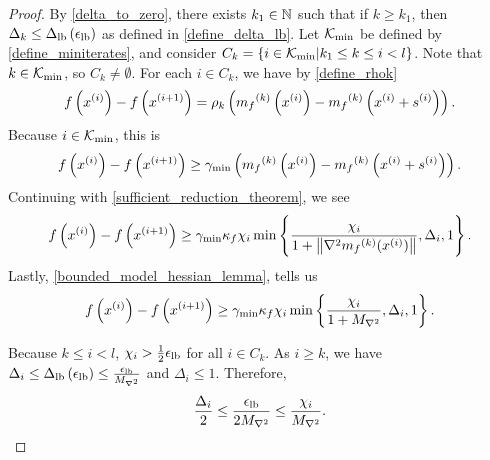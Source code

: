 \begin{proof}
By \cref{delta_to_zero}, there exists $k_1 \in \mathbb N$ such that if $k \ge k_1$, 
then $\Delta_k \le{\Delta_{\textrm{lb}}\left(\epsilon_{\textrm{lb}}\right)}$ as defined in \cref{define_delta_lb}.
Let ${\mathcal K_{\textrm{min}}}$ be defined by \cref{define_miniterates}, and consider
$C_k = \left\{i \in {\mathcal K_{\textrm{min}}} | k_1 \le k \le i < l \right\}$.
Note that $k \in {\mathcal K_{\textrm{min}}}$, so $C_k \ne \emptyset $.
For each $i \in C_k$, we have by \cref{define_rhok}
\begin{align*}
f\left(x^{(i)}\right) - f\left(x^{(i+1)}\right) 
= \rho_k \left( {{m}_f}^{(k)}\left(x^{(i)}\right) - {{m}_f}^{(k)}\left(x^{(i)} + s^{(i)}\right) \right).
\end{align*}
Because $i \in {\mathcal K_{\textrm{min}}}$, this is
\begin{align*}
f\left(x^{(i)}\right) - f\left(x^{(i+1)}\right) \ge \gamma_{\textrm{min}} \left( {{m}_f}^{(k)}\left(x^{(i)}\right) - {{m}_f}^{(k)}\left(x^{(i)} + s^{(i)}\right) \right).
\end{align*}
Continuing with \cref{sufficient_reduction_theorem}, we see
\begin{align*}
f\left(x^{(i)}\right) - f\left(x^{(i+1)}\right)\ge \gamma_{\textrm{min}} \kappa_f \chi_i \min\left\{\frac{\chi_i}{1+\left\|\nabla^2 {{m}_f}^{(k)}(x^{(i)})\right\|}, \Delta_i, 1\right\} .
\end{align*}
Lastly, \cref{bounded_model_hessian_lemma}, tells us
\begin{align*}
f\left(x^{(i)}\right) - f\left(x^{(i+1)}\right)\ge \gamma_{\textrm{min}} \kappa_f \chi_i \min\left\{\frac{\chi_{i}}{1 + {M_{\nabla^2}}}, \Delta_i, 1\right\}.
\end{align*}

Because $ k \le i < l$, $\chi_i > \frac 1 2 {\epsilon_{\textrm{lb}}}$ for all $i \in C_k$.
As $i \ge k$, we have $\Delta_i \le {\Delta_{\textrm{lb}}\left(\epsilon_{\textrm{lb}}\right)} \le \frac{{\epsilon_{\textrm{lb}}}}{{M_{\nabla^2}}}$ and $\Delta_i \le 1$.
Therefore,
\begin{align*}
\frac{\Delta_i}{2} \le \frac{{\epsilon_{\textrm{lb}}}}{2 {M_{\nabla^2}}} \le \frac{\chi_i}{{M_{\nabla^2}}}.
\end{align*}


\end{proof}
